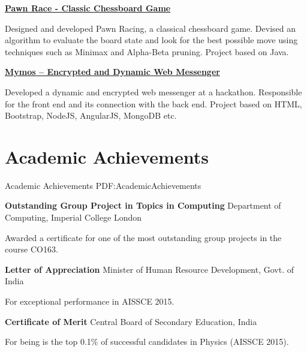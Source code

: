 \documentclass[letterpaper,10pt,oneside]{article}
\begin{document}
\begin{body}
\GapNoBreak

\BulletItem
\href{https://github.com/mishrabhinav/javachess-pawnrace}
{\textbf{Pawn Race - Classic Chessboard Game}}
\hfill
{}
\begin{detail}
\GapNoBreak
\SubBulletItem
Designed and developed Pawn Racing, a classical chessboard game.
\SubBulletItem
Devised an algorithm to evaluate the board state and look for the best possible
move using techniques such as Minimax and Alpha-Beta pruning.
\SubBulletItem
Project based on Java.
\end{detail}

\GapNoBreak

\BulletItem
\href{https://github.com/SomeRandomTeam/hackkings2015}
{\textbf{Mymos – Encrypted and Dynamic Web Messenger}}
\hfill
{}
\begin{detail}
\GapNoBreak
\SubBulletItem
Developed a dynamic and encrypted web messenger at a hackathon.
\SubBulletItem
Responsible for the front end and its connection with the back end.
\SubBulletItem
Project based on HTML, Bootstrap, NodeJS, AngularJS, MongoDB etc.
\end{detail}


\section
{Academic Achievements}
{Academic Achievements}
{PDF:AcademicAchievements}

\BulletItem
\textbf{Outstanding Group Project in Topics in Computing}
\hfill
{}
\newline
Department of Computing, Imperial College London
\begin{detail}
\SubItem
Awarded a certificate for one of the most outstanding group projects in the
course CO163.
\end{detail}

\GapNoBreak

\BulletItem
\textbf{Letter of Appreciation}
\hfill
{}
\newline
Minister of Human Resource Development,
Govt. of India
\begin{detail}
\SubItem
For exceptional performance in AISSCE 2015.
\end{detail}

\GapNoBreak

\BulletItem
\textbf{Certificate of Merit}
\hfill
{}
\newline
Central Board of Secondary Education,
India
\begin{detail}
\SubItem
For being is the top 0.1\% of successful candidates in Physics (AISSCE 2015).
\end{detail}


\end{body}
\end{document}
